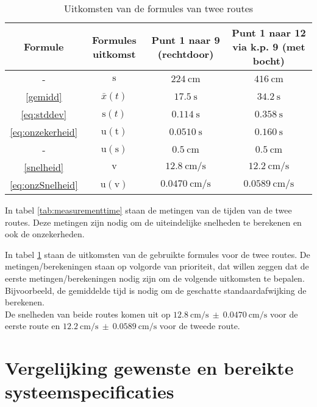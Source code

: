 \documentclass{report}
\begin{document}
\begin{table}[H]
\begin{tabular}{|c|c|c|c|}
\hline 
Formule & Formules uitkomst & Punt 1 naar 9 (rechtdoor) & Punt 1 naar 12 via k.p. 9 (met bocht) \\ 
\hline
- &	$\mathrm{s}$ 	& $224 \:\mathrm{cm}$ & $416 \:\mathrm{cm}$\\ 
\hline
\ref{gemidd} &	$\bar{x}(t)$ 	& $17.5 \:\mathrm{s}$ & $34.2 \:\mathrm{s}$ \\ 
\hline 
\ref{eq:stddev} &	$\mathrm{s}(t)$ & $0.114 \:\mathrm{s}$ & $0.358 \:\mathrm{s}$ \\ 
\hline 
\ref{eq:onzekerheid} &	$\mathrm{u(t)}$ & $0.0510 \:\mathrm{s}$ & $0.160 \:\mathrm{s}$ \\ 
\hline 
- &	$\mathrm{u(s)}$ & $0.5 \:\mathrm{cm}$ & $0.5 \:\mathrm{cm}$ \\ 
\hline
\ref{snelheid} &	$\mathrm{v}$ 	& $12.8 \:\mathrm{cm/s}$  & $12.2 \:\mathrm{cm/s}$\\
\hline
\ref{eq:onzSnelheid} &	$\mathrm{u(v)}$ & $0.0470 \:\mathrm{cm/s}$ & $0.0589 \:\mathrm{cm/s}$\\
\hline
\end{tabular} 
\caption{Uitkomsten van de formules van twee routes}
\label{tab:uitkomstform}
\end{table}

In tabel \ref{tab:measurementtime} staan de metingen van de tijden van de twee routes. Deze metingen zijn nodig om de uiteindelijke snelheden te berekenen en ook de onzekerheden.

In tabel \ref{tab:uitkomstform} staan de uitkomsten van de gebruikte formules voor de twee routes. De metingen/berekeningen staan op volgorde van prioriteit, dat willen zeggen dat de eerste metingen/berekeningen nodig zijn om de volgende uitkomsten te bepalen. Bijvoorbeeld, de gemiddelde tijd is nodig om de geschatte standaardafwijking de berekenen.\\

De snelheden van beide routes komen uit op
$12.8 \: \mathrm{cm/s} \: \pm \: 0.0470 \:            \mathrm{cm/s}$ voor de eerste route en 
$12.2 \: \mathrm{cm/s} \: \pm \: 0.0589 \:\mathrm{cm/s}$ voor de tweede route.

\newpage
\section{Vergelijking gewenste en bereikte systeemspecificaties}
\label{sec:vergelijkingSpecs}
\end{document}

